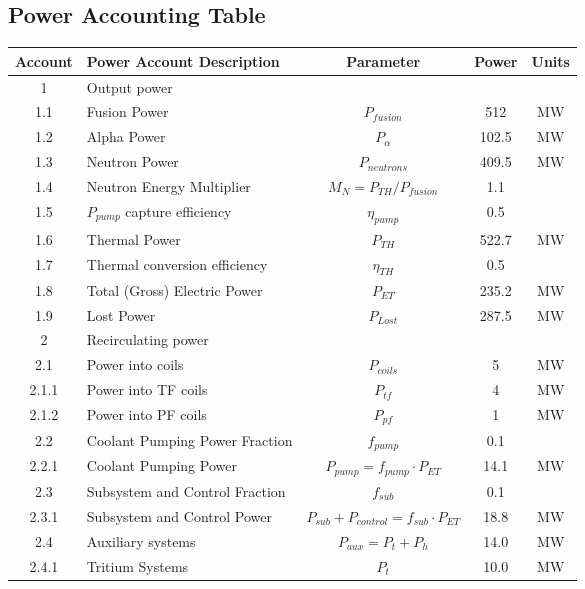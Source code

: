 \newpage
\subsection{Power Accounting Table}

\begin{table}[ht!]								
\centering								
\begin{tabular}{|c|p{5cm}|c|c|c|}								
\hline								
\textbf{Account}	&	\textbf{Power Account Description}	&	\textbf{Parameter }	&	\textbf{Power}	&	\textbf{Units} \\
\hline								
1	&	Output power	&		&		&	\\
\hline
1.1	&	Fusion Power	&	$P_{{fusion}}$	&	512	&	MW \\
1.2	&	Alpha Power	&	$P_{{\alpha}}$	&	102.5	&	MW \\
1.3	&	Neutron Power	&	$P_{{neutrons}}$	&	409.5	&	MW \\
1.4	&	Neutron Energy Multiplier	&	$M_N = P_{{TH}}/P_{{fusion}}$	&	1.1	&	\\
1.5	&	$P_{pump}$ capture efficiency	&	$\eta_{{pump}}$	&	0.5	&	\\
1.6	&	Thermal Power	&	$P_{{TH}}$	&	522.7	&	MW \\
1.7	&	Thermal conversion efficiency	&	$\eta_{{TH}}$	&	0.5	&	\\
1.8	&	Total (Gross) Electric Power	&	$P_{{ET}}$	&	235.2	&	MW \\
1.9	&	Lost Power	&	$P_{{Lost}}$	&	287.5	&	MW \\
\hline								
2	&	Recirculating power	&		&		&	\\
\hline
2.1	&	Power into coils 	&	$P_{coils}$ &	5	&	MW \\
2.1.1	&	Power into TF coils	&	$P_{tf}$	&	4	&	MW \\
2.1.2	&	Power into PF coils	&	$P_{pf}$	&	1		&	MW \\
2.2	&	Coolant Pumping Power Fraction	&	$f_{{pump}}$	&	0.1 &	\\
2.2.1	&	Coolant Pumping Power	&	$P_{{pump}} = f_{{pump}} \cdot P_{{ET}}$	&	14.1	&	MW \\
2.3	&	Subsystem and Control Fraction	&	$f_{{sub}}$	&	0.1	&	\\
2.3.1	&	Subsystem and Control Power	&	$P_{{sub}} + P_{{control}} = f_{{sub}} \cdot P_{{ET}}$	&	18.8	&	MW \\
2.4	&	Auxiliary systems	&	$P_{{aux}} = P_{{t}} + P_{{h}}$	&	14.0	&	MW \\
2.4.1	&	Tritium Systems	&	$P_{{t}}$	&	10.0	&	MW \\

\end{tabular}
\end{table}

